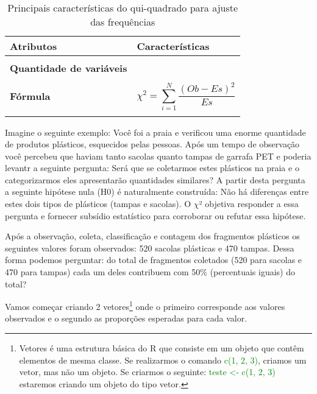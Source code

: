\documentclass[14pt,titlepage, oneside, openany, a4paper]{book}
\begin{document}
\begin{table}

\caption{\label{tab:tab1qui}Principais características do qui-quadrado para ajuste das frequências}
\centering
\begin{tabular}[c]{>{\raggedright\arraybackslash}p{10em}>{\raggedright\arraybackslash}p{30em}}
\toprule
Atributos & Características\\
\midrule
\textbf{\cellcolor{gray!6}{Tipo de variável}} & \cellcolor{gray!6}{Categórica}\\
\textbf{Quantidade de variáveis} & 1\\
\textbf{\cellcolor{gray!6}{Hipótese nula}} & \cellcolor{gray!6}{O número de observações em cada grupo da variável é similar ao predito pela teoria}\\
\textbf{Fórmula} & $$\chi^2=\sum^{N}_{i = 1}\frac{(Ob-Es)^2}{Es}$$\\
\textbf{\cellcolor{gray!6}{Observação}} & \cellcolor{gray!6}{Se há apenas 2 categorias, dentro da variável, não há a necessidade de post-hoc nem expressa-la graficamente}\\
\bottomrule
\end{tabular}
\end{table}

Imagine o seguinte exemplo: Você foi a praia e verificou uma enorme quantidade de produtos plásticos, esquecidos pelas pessoas. Após um tempo de observação você percebeu que haviam tanto sacolas quanto tampas de garrafa PET e poderia levantr a seguinte pergunta: Será que se coletarmos estes plásticos na praia e o categorizarmos eles apresentarão quantidades similares? A partir desta pergunta a seguinte hipótese nula (H0) é naturalmente construída: Não há diferenças entre estes dois tipos de plásticos (tampas e sacolas). O \(\chi\)² objetiva responder a essa pergunta e fornecer subsídio estatístico para corroborar ou refutar essa hipótese.

Após a observação, coleta, classificação e contagem dos fragmentos plásticos os seguintes valores foram observados: 520 sacolas plásticas e 470 tampas. Dessa forma podemos perguntar: do total de fragmentos coletados (520 para sacolas e 470 para tampas) cada um deles contribuem com 50\% (percentuais iguais) do total?

Vamos começar criando 2 vetores\footnote{Vetores é uma estrutura básica do R que consiste em um objeto que contêm elementos de mesma classe. Se realizarmos o comando \textcolor{green}{c(1, 2, 3)}, criamos um vetor, mas não um objeto. Se criarmos o seguinte: \textcolor{green}{teste <- c(1, 2, 3)} estaremos criando um objeto do tipo vetor.} onde o primeiro corresponde aos valores observados e o segundo as proporções esperadas para cada valor.
\end{document}
